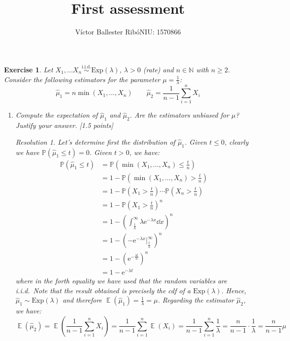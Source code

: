 \documentclass[10pt,a4paper]{article}
\title{\bfseries\Large First assessment}
\author{Víctor Ballester Ribó\endgraf NIU: 1570866}
\date{\parbox{\linewidth}{\centering
  Statistics\endgraf
  Degree in Mathematics\endgraf
  Universitat Autònoma de Barcelona\endgraf
  March 2022}}
\newcommand{\NN}{\ensuremath{\mathbb{N}}}
\theoremstyle{plain}
\newtheorem{exercice}{Exercise}
\theoremstyle{remark}
\newtheorem*{resolution}{Resolution}
\newcommand{\Prob}{\ensuremath{\mathbb{P}}} %
\DeclareMathOperator{\Exp}{\mathbb{E}} %
\renewcommand{\exp}[1]{\mathrm{e}^{#1}} %
\newcommand{\iid}{i.i.d.\ } %
\begin{document}
\maketitle
\begin{exercice}
  Let $X_1,\ldots X_n\overset{\text{i.i.d.}}{\sim}\text{Exp}(\lambda)$, $\lambda>0$ (rate) and $n\in\NN$ with $n\geq 2$. Consider the following estimators for the parameter $\mu=\frac{1}{\lambda}$: $$\hat{\mu}_1=n\min(X_1,\ldots,X_n)\qquad\hat{\mu}_2=\frac{1}{n-1}\sum_{i=1}^nX_i$$
  \begin{enumerate}
    \item Compute the expectation of $\hat{\mu}_1$ and $\hat{\mu}_2$. Are the estimators unbiased for $\mu$? Justify your answer. [1.5 points]
          \begin{resolution}
            Let's determine first the distribution of $\hat\mu_1$. Given $t\leq 0$, clearly we have $\Prob(\hat\mu_1\leq t)=0$. Given $t> 0$, we have:
            \begin{align*}
              \Prob(\hat\mu_1\leq t) & =\Prob\left(\min(X_1,\ldots,X_n)\leq\frac{t}{n}\right)                       \\
                                     & = 1-\Prob\left(\min(X_1,\ldots,X_n)>\frac{t}{n}\right)                       \\
                                     & = 1-\Prob\left(X_1>\frac{t}{n}\right)\cdots\Prob\left(X_n>\frac{t}{n}\right) \\
                                     & = 1-{\Prob\left(X_1>\frac{t}{n}\right)}^n                                    \\
                                     & = 1-{\left(\int_{\frac{t}{n}}^\infty \lambda\exp{-\lambda x}\dd{x}\right)}^n \\
                                     & = 1-{\left(-\exp{-\lambda x}\Big|_{\frac{t}{n}}^\infty\right)}^n             \\
                                     & = 1-{\left(\exp{-\frac{\lambda t}{n}}\right)}^n                              \\
                                     & = 1-\exp{-\lambda t}
            \end{align*}
            where in the forth equality we have used that the random variables are \iid Note that the result obtained is precisely the cdf of a $\text{Exp}(\lambda)$. Hence, $\hat\mu_1\sim\text{Exp}(\lambda)$ and therefore $\Exp(\hat\mu_1)=\frac{1}{\lambda}=\mu$. Regarding the estimator $\hat\mu_2$, we have: $$\Exp(\hat\mu_2)=\Exp\left(\frac{1}{n-1}\sum_{i=1}^nX_i\right)=\frac{1}{n-1}\sum_{i=1}^n\Exp(X_i)=\frac{1}{n-1}\sum_{i=1}^n\frac{1}{\lambda}=\frac{n}{n-1}\cdot\frac{1}{\lambda}=\frac{n}{n-1}\mu$$

\end{resolution}
\end{enumerate}
\end{exercice}
\end{document}

